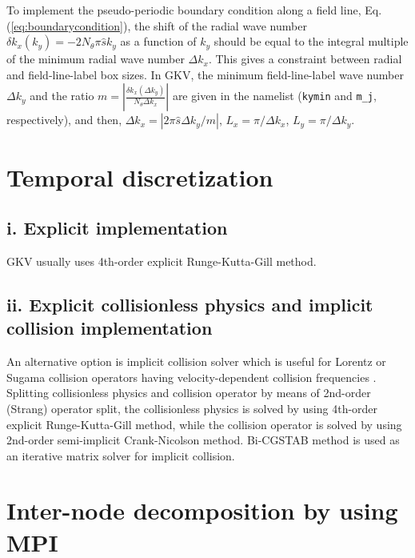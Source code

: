 To implement the pseudo-periodic boundary condition along a field line, Eq. (\ref{eq:boundarycondition}), the shift of the radial wave number $\delta k_x (k_y) = - 2N_\theta \pi \hat{s} k_y$ as a function of $k_y$ should be equal to the integral multiple of the minimum radial wave number $\Delta k_x$. This gives a constraint between radial and field-line-label box sizes. In GKV, the minimum field-line-label wave number $\Delta k_y$ and the ratio $m = \left| \frac{\delta k_x (\Delta k_y)}{N_\theta \Delta k_x} \right|$ are given in the namelist (\texttt{kymin} and \texttt{m\_j}, respectively), and then, $\Delta k_x = |2\pi \hat{s} \Delta k_y / m|$, $L_x = \pi /\Delta k_x$, $L_y = \pi / \Delta k_y$.




\section{Temporal discretization}
\label{sec:Temporal discretization}

\subsection{i. Explicit implementation}
GKV usually uses 4th-order explicit Runge-Kutta-Gill method. \cite{Gill1951CPS}

\subsection{ii. Explicit collisionless physics and implicit collision implementation}

An alternative option is implicit collision solver which is useful for Lorentz or Sugama collision operators having velocity-dependent collision frequencies \cite{Maeyama2018CPC}. Splitting collisionless physics and collision operator by means of 2nd-order (Strang) operator split, the collisionless physics is solved by using 4th-order explicit Runge-Kutta-Gill method, while the collision operator is solved by using 2nd-order semi-implicit Crank-Nicolson method. Bi-CGSTAB method is used as an iterative matrix solver for implicit collision.





\section{Inter-node decomposition by using MPI}
\label{sec:Inter-node decomposition by using MPI}

